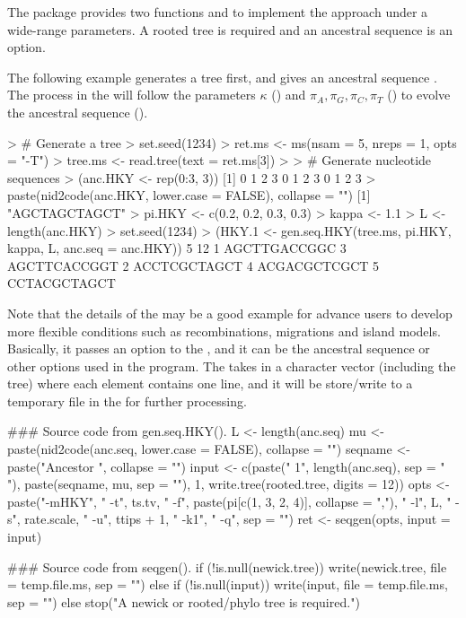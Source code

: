 The  package provides two functions  and
 to implement the 
approach under a wide-range parameters. A rooted tree is required and an
ancestral sequence is an option.

The following example generates a tree first, and gives an ancestral
sequence . The process in the  will follow
the parameters $\kappa$ () and
$\pi_{A}, \pi_{G}, \pi_{C}, \pi_{T}$ ()
to evolve the ancestral sequence ().
\begin{Code}
> # Generate a tree
> set.seed(1234)
> ret.ms <- ms(nsam = 5, nreps = 1, opts = "-T")
> tree.ms <- read.tree(text = ret.ms[3])
> 
> # Generate nucleotide sequences
> (anc.HKY <- rep(0:3, 3))
 [1] 0 1 2 3 0 1 2 3 0 1 2 3
> paste(nid2code(anc.HKY, lower.case = FALSE), collapse = "")
[1] "AGCTAGCTAGCT"
> pi.HKY <- c(0.2, 0.2, 0.3, 0.3)
> kappa <- 1.1
> L <- length(anc.HKY)
> set.seed(1234)
> (HKY.1 <- gen.seq.HKY(tree.ms, pi.HKY, kappa, L, anc.seq = anc.HKY))
 5 12
1         AGCTTGACCGGC
3         AGCTTCACCGGT
2         ACCTCGCTAGCT
4         ACGACGCTCGCT
5         CCTACGCTAGCT
\end{Code}

Note that the details of the  may be a good example
for advance users to develop more flexible conditions such as recombinations,
migrations and island models. Basically, it passes an option  to
the , and it can be the ancestral sequence or other
options used in the  program.
The  takes in a character vector (including the tree)
where each element contains one line, and it will be store/write to
a temporary file in the  for further processing.
\begin{Code}
### Source code from gen.seq.HKY().
        L <- length(anc.seq)
        mu <- paste(nid2code(anc.seq, lower.case = FALSE), collapse = "")
        seqname <- paste("Ancestor  ", collapse = "")
        input <- c(paste(" 1", length(anc.seq), sep = " "), paste(seqname, 
            mu, sep = ""), 1, write.tree(rooted.tree, digits = 12))
        opts <- paste("-mHKY", " -t", ts.tv, " -f", paste(pi[c(1, 
            3, 2, 4)], collapse = ","), " -l", L, " -s", rate.scale, 
            " -u", ttips + 1, " -k1", " -q", sep = "")
        ret <- seqgen(opts, input = input)

### Source code from seqgen().
        if (!is.null(newick.tree)) {
            write(newick.tree, file = temp.file.ms, sep = "")
        }
        else if (!is.null(input)) {
            write(input, file = temp.file.ms, sep = "\n")
        }
        else {
            stop("A newick or rooted/phylo tree is required.")
        }
\end{Code}

